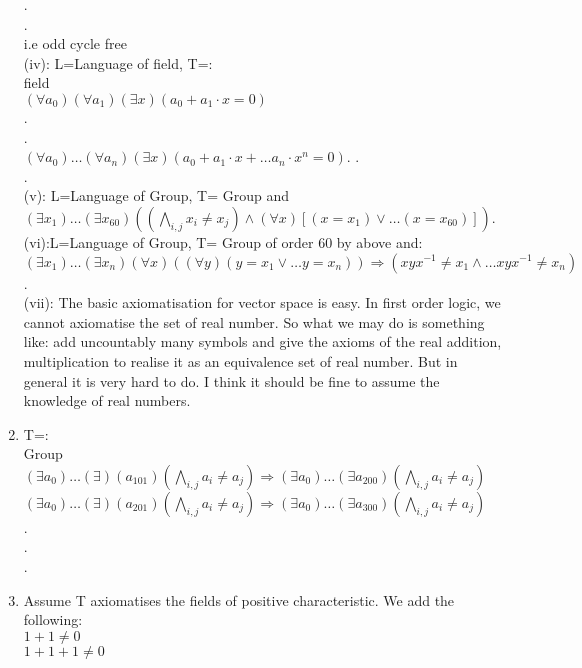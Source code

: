 \begin{enumerate}
     .\\
     .\\
     i.e odd cycle free\\
     (iv): L=Language of field, T=:\\
     field\\
     $(\forall a_0)(\forall a_1)(\exists x)(a_0+a_1 \cdot x =0)$\\
     .\\
     .\\
     $(\forall a_0) \ldots (\forall a_n)(\exists x)(a_0 +a_1 \cdot x + \ldots a_n \cdot x^n=0)$.
     .\\
     .\\
     (v): L=Language of Group, T= Group and $(\exists x_1) \ldots (\exists x_60)((\bigwedge_{i,j}x_i \neq x_j) \wedge (\forall x)[(x=x_1) \vee \ldots (x=x_{60})])$.\\
     (vi):L=Language of Group, T= Group of order $60$ by above and:\\
     $(\exists x_1) \ldots (\exists x_n)(\forall x)((\forall y)(y=x_1 \vee \ldots y=x_n)) \Rightarrow (xyx^{-1} \neq x_1 \wedge \ldots xyx^{-1} \neq x_n)$.\\
     (vii): The basic axiomatisation for vector space is easy. In first order logic, we cannot axiomatise the set of real number. So what we may do is something like: add uncountably many symbols and give the axioms of the real addition, multiplication to realise it as an equivalence set of real number. But in general it is very hard to do. I think it should be fine to assume the knowledge of real numbers.
\item T=:\\
      Group\\
      $(\exists a_0) \ldots (\exists)(a_{101})(\bigwedge_{i,j}a_i \neq a_j) \Rightarrow (\exists a_0) \ldots (\exists a_{200})(\bigwedge_{i,j} a_i \neq a_j)$\\
      $(\exists a_0) \ldots (\exists)(a_{201})(\bigwedge_{i,j}a_i \neq a_j) \Rightarrow (\exists a_0) \ldots (\exists a_{300})(\bigwedge_{i,j} a_i \neq a_j)$\\
      .\\
      .\\
      .\\
\item Assume T axiomatises the fields of positive characteristic. We add the following:\\
      $1+1 \neq 0$\\
      $1+1+1 \neq 0$\\

\end{enumerate}

